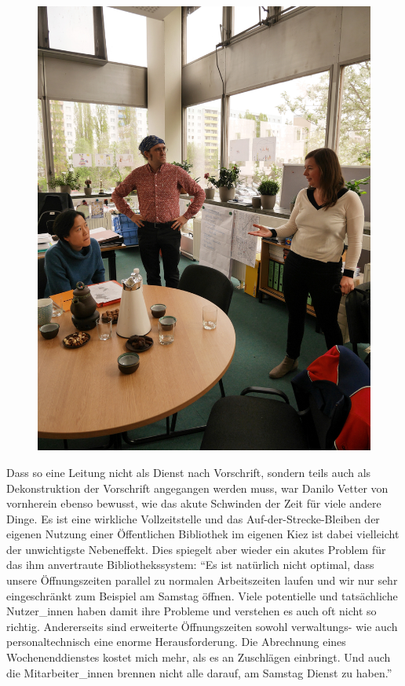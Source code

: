 \documentclass[a4paper,
fontsize=11pt,
oneside,
numbers=noperiodatend,
parskip=half-,
bibliography=totoc,
final
]{scrartcl}
\begin{document}
\begin{figure}
\centering
\includegraphics{img/libreas-boell-apr-2017.jpg}
\end{figure}

Dass so eine Leitung nicht als Dienst nach Vorschrift, sondern teils
auch als Dekonstruktion der Vorschrift angegangen werden muss, war
Danilo Vetter von vornherein ebenso bewusst, wie das akute Schwinden der
Zeit für viele andere Dinge. Es ist eine wirkliche Vollzeitstelle und
das Auf-der-Strecke-Bleiben der eigenen Nutzung einer Öffentlichen
Bibliothek im eigenen Kiez ist dabei vielleicht der unwichtigste
Nebeneffekt. Dies spiegelt aber wieder ein akutes Problem für das ihm
anvertraute Bibliothekssystem: \enquote{Es ist natürlich nicht optimal,
dass unsere Öffnungszeiten parallel zu normalen Arbeitszeiten laufen und
wir nur sehr eingeschränkt zum Beispiel am Samstag öffnen. Viele
potentielle und tatsächliche Nutzer\_innen haben damit ihre Probleme und
verstehen es auch oft nicht so richtig. Andererseits sind erweiterte
Öffnungszeiten sowohl verwaltungs- wie auch personaltechnisch eine
enorme Herausforderung. Die Abrechnung eines Wochenenddienstes kostet
mich mehr, als es an Zuschlägen einbringt. Und auch die
Mitarbeiter\_innen brennen nicht alle darauf, am Samstag Dienst zu
haben.}
\end{document}
